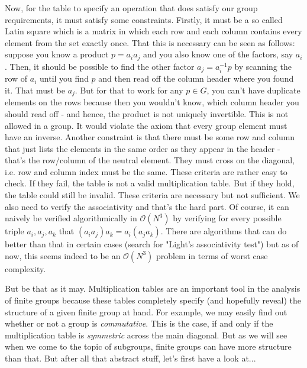 \medskip
Now, for the table to specify an operation that does satisfy our group requirements, it must satisfy some constraints. Firstly, it must be a so called Latin square which is a matrix in which each row and each column contains every element from the set exactly once. That this is necessary can be seen as follows: suppose you know a product $p = a_i a_j$ and you also know one of the factors, say $a_i$. Then, it should be possible to find the other factor $a_j = a_i^{-1} p$ by scanning the row of $a_i$ until you find $p$ and then read off the column header where you found it. That must be $a_j$. But for that to work for any $p \in G$, you can't have duplicate elements on the rows because then you wouldn't know, which column header you should read off - and hence, the product is not uniquely invertible. This is not allowed in a group. It would violate the axiom that every group element must have an inverse. Another constraint is that there must be some row and column that just lists the elements in the same order as they appear in the header - that's the row/column of the neutral element. They must cross on the diagonal, i.e. row and column index must be the same. These criteria are rather easy to check. If they fail, the table is not a valid multiplication table. But if they hold, the table could still be invalid. These criteria are necessary but not sufficient. We also need to verify the associativity and that's the hard part. Of course, it can naively be verified algorithmically in $\mathcal{O}(N^3)$ by verifying for every possible triple $a_i, a_j, a_k$ that $(a_i a_j) a_k = a_i (a_j a_k)$. There are algorithms that can do better than that in certain cases (search for "Light's associativity test") but as of now, this seems indeed to be an $\mathcal{O}(N^3)$ problem in terms of worst case complexity.

\medskip
But be that as it may. Multiplication tables are an important tool in the analysis of finite groups because these tables completely specify (and hopefully reveal) the structure of a given finite group at hand. For example, we may easily find out whether or not a group is \emph{commutative}. This is the case, if and only if the multiplication table is \emph{symmetric} across the main diagonal. But as we will see when we come to the topic of subgroups, finite groups can have more structure than that. But after all that abstract stuff, let's first have a look at...



